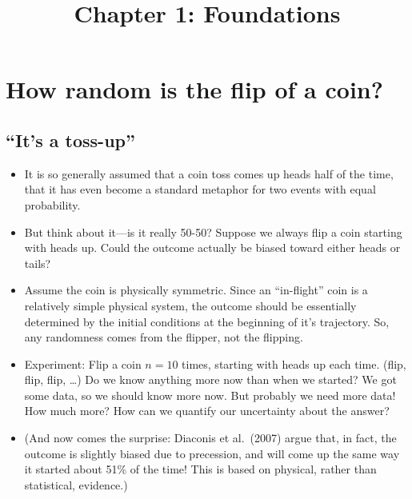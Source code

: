 \documentclass[12pt]{article}
\title{Chapter 1: Foundations}
\author{}
\date{}
\begin{document}
\maketitle
{\footnotesize
\tableofcontents 
}
\thispagestyle{firststyle}

\newpage

\section{How random is the flip of a coin?}

\subsection{``It's a toss-up''}
\begin{itemize}
\item It is so generally assumed that a coin toss comes up heads half of the time, that it has even become a standard metaphor for two events with equal probability.
\item But think about it---is it really 50-50? Suppose we always flip a coin starting with heads up. Could the outcome actually be biased toward either heads or tails?
\item Assume the coin is physically symmetric. Since an ``in-flight'' coin is a relatively simple physical system, the outcome should be essentially determined by the initial conditions at the beginning of it's trajectory. So, any randomness comes from the flipper, not the flipping.
\item Experiment: Flip a coin $n = 10$ times, starting with heads up each time. (flip, flip, flip, \dots) Do we know anything more now than when we started? We got some data, so we should know more now. But probably we need more data! How much more? How can we quantify our uncertainty about the answer?
\item (And now comes the surprise: Diaconis et al.\ (2007) argue that, in fact, the outcome is slightly biased due to precession, and will come up the same way it started about 51\% of the time!  This is based on physical, rather than statistical, evidence.)
\end{itemize}
\end{document}
